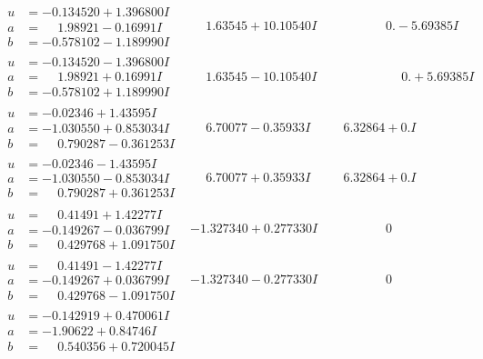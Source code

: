 \documentclass[1p]{elsarticle_modified}
\theoremstyle{definition}
\begin{document}
$$\begin{array}{c|c|c}
\begin{aligned}
u &= -0.134520 + 1.396800 I \\
a &= \phantom{-}1.98921 - 0.16991 I \\
b &= -0.578102 - 1.189990 I\end{aligned}
 & \phantom{-}1.63545 + 10.10540 I & \phantom{-0.000000 } 0. - 5.69385 I \\ \hline\begin{aligned}
u &= -0.134520 - 1.396800 I \\
a &= \phantom{-}1.98921 + 0.16991 I \\
b &= -0.578102 + 1.189990 I\end{aligned}
 & \phantom{-}1.63545 - 10.10540 I & \phantom{-0.000000 -}0. + 5.69385 I \\ \hline\begin{aligned}
u &= -0.02346 + 1.43595 I \\
a &= -1.030550 + 0.853034 I \\
b &= \phantom{-}0.790287 - 0.361253 I\end{aligned}
 & \phantom{-}6.70077 - 0.35933 I & \phantom{-}6.32864 + 0. I\phantom{ +0.000000I} \\ \hline\begin{aligned}
u &= -0.02346 - 1.43595 I \\
a &= -1.030550 - 0.853034 I \\
b &= \phantom{-}0.790287 + 0.361253 I\end{aligned}
 & \phantom{-}6.70077 + 0.35933 I & \phantom{-}6.32864 + 0. I\phantom{ +0.000000I} \\ \hline\begin{aligned}
u &= \phantom{-}0.41491 + 1.42277 I \\
a &= -0.149267 - 0.036799 I \\
b &= \phantom{-}0.429768 + 1.091750 I\end{aligned}
 & -1.327340 + 0.277330 I & \phantom{-0.000000 } 0 \\ \hline\begin{aligned}
u &= \phantom{-}0.41491 - 1.42277 I \\
a &= -0.149267 + 0.036799 I \\
b &= \phantom{-}0.429768 - 1.091750 I\end{aligned}
 & -1.327340 - 0.277330 I & \phantom{-0.000000 } 0 \\ \hline\begin{aligned}
u &= -0.142919 + 0.470061 I \\
a &= -1.90622 + 0.84746 I \\
b &= \phantom{-}0.540356 + 0.720045 I\end{aligned}

\end{array}$$
\end{document}
